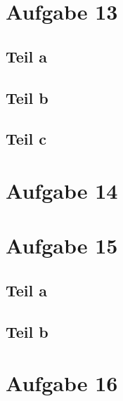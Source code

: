 \documentclass[10pt,a4paper]{article}
\begin{document}
\section{Aufgabe 13}

\subsection{Teil a}

\subsection{Teil b}

\subsection{Teil c}

\section{Aufgabe 14}

\section{Aufgabe 15}

\subsection{Teil a}

\subsection{Teil b}

\section{Aufgabe 16}
\end{document}
